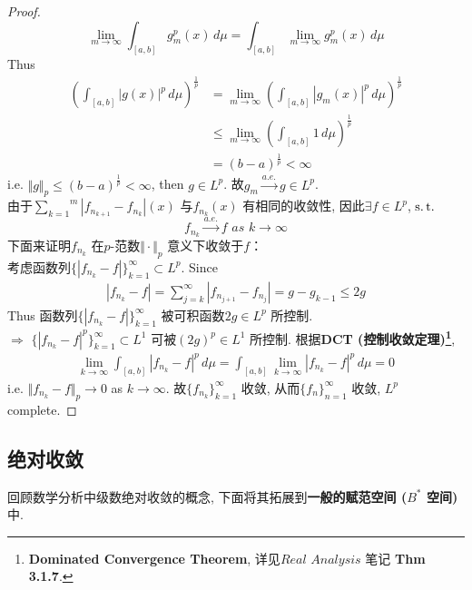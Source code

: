 \begin{thm}
\begin{proof}
			\[ \lim_{m \to \infty} \int_{[a , b]} g_{m}^p(x) \, d\mu = \int_{[a , b]} \lim_{m \to \infty} g_{m}^p(x) \, d\mu \]
			Thus
			\begin{align}
				\left( \int_{[a , b]} \left| g(x) \right|^p \, d\mu \right)^{\tfrac{1}{p}} 
				&= \lim_{m \to \infty} \left( \int_{[a , b]} \left| g_{m}(x) \right|^p \, d\mu \right)^{\tfrac{1}{p}} \\
				&\leq \lim_{m \to \infty} \left( \int_{[a , b]} 1 \, d\mu \right)^{\tfrac{1}{p}} \\
				&= (b - a)^{\tfrac{1}{p}} < \infty
			\end{align}
			i.e. $\Vert g \Vert_{p} \leq (b - a)^{\tfrac{1}{p}} < \infty$, then $g \in L^p$. 故$g_m \overset{a.e.}{\to} g \in L^p$. \\
			由于$\overset{m}{\underset{k = 1}{\sum}} \left| f_{n_{k + 1}} - f_{n_k} \right|(x)$ 与$f_{n_k}(x)$ 有相同的收敛性, 因此$\exists f \in L^p$, $\operatorname{s.t.}$
			\[ f_{n_k} \overset{a.e.}{\to} f \,\, as \,\, k \to \infty \]
			下面来证明$f_{n_k}$ 在$p$-范数$\Vert \cdot \Vert_p$ 意义下收敛于$f$：\\
			考虑函数列$\{ \left| f_{n_k} - f \right| \}_{k = 1}^{\infty} \subset L^p$. Since
			\begin{align}
				\left| f_{n_k} - f \right| 
				= \sum_{j = k}^{\infty} \left| f_{n_{j + 1}} - f_{n_j} \right| 
				= g - g_{k - 1} \leq 2g
			\end{align}
			Thus 函数列$\{ \left| f_{n_k} - f \right| \}_{k = 1}^{\infty}$ 被可积函数$2g \in L^p$ 所控制. \\
			$\Rightarrow \,\, \{ \left| f_{n_k} - f \right|^p \}_{k = 1}^{\infty} \subset L^1$ 可被$(2g)^p \in L^1$ 所控制. 根据\textbf{DCT (控制收敛定理)\footnote{\textbf{Dominated Convergence Theorem}, 详见$Real \,\, Analysis$ 笔记 \textbf{Thm 3.1.7}.}}, 
			\begin{align}
				\lim_{k \to \infty} \int_{[a , b]} \left| f_{n_k} - f \right|^p \, d\mu 
				= \int_{[a , b]} \lim_{k \to \infty} \left| f_{n_k} - f \right|^p \, d\mu = 0
			\end{align}
			i.e. $\Vert f_{n_k} - f \Vert_{p} \to 0$ as $k \to \infty$. 故$\{ f_{n_k} \}_{k = 1}^{\infty}$ 收敛, 从而$\{ f_n \}_{n = 1}^{\infty}$ 收敛, $L^p$ complete.
		\end{proof}
	\end{thm}

\newpage

\subsection{绝对收敛}
	回顾数学分析中级数绝对收敛的概念, 下面将其拓展到\textbf{一般的赋范空间 ($B^*$ 空间)}中. 
	
